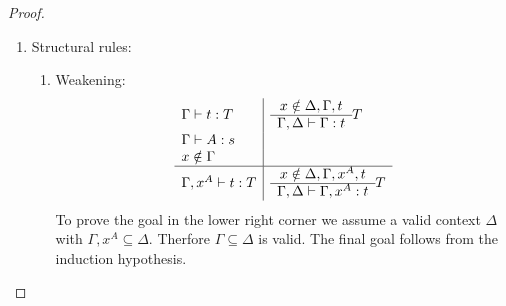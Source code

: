\begin{lemma}
\begin{proof}
{\begin{enumerate}
\begin{enumerate}
                \item Abstraction:
                $$
                \begin{array}{l|l}
                    \Gamma \vdash \Pi x^A. B: s
                    &
                    \goal \Delta \Gamma {\Pi x^A.B} s
                    \\
                    \Gamma,x^A \vdash e: B
                    &
                    \goal {\Delta'} {\Gamma, x^A} e B
                    \\
                    \hline
                    \Gamma \vdash \lambda x^A. e: \Pi x^A. B
                    &
                    \goal \Delta \Gamma {\lambda x^A. e} {\Pi x^A. B}
                \end{array}
                $$
                Same reasoning as with product.

                \item Application:
                $$
                \begin{array}{l|l}
                    \Gamma \vdash f: \Pi x^A.B
                    &
                    \goal \Delta \Gamma f {\Pi x^A.B}
                    \\
                    \Gamma \vdash a: A
                    &
                    \goal \Delta \Gamma a A
                    \\
                    \hline
                    \Gamma \vdash f a : B[x:=a]
                    &
                    \goal \Delta \Gamma {f a} {B[x:=a]}
                \end{array}
                $$
                The goal in the lower right corner is an immediate consequence
                of the induction hypotheses.
            \end{enumerate}

            \item Structural rules:
            \begin{enumerate}
                \item Weakening:
                $$
                \begin{array}{l|l}
                    \Gamma \vdash t : T
                    &
                    \begin{array}{c}  x \notin \Delta, \Gamma, t  \\ \hline  \Gamma,\Delta \vdash \Gamma : t \end{array} T
                    \\
                    \Gamma \vdash A : s
                    \\
                    x \notin \Gamma
                    \\
                    \hline
                    \Gamma,x^A \vdash t: T
                    &
                    \begin{array}{c}  x \notin \Delta, \Gamma,x^A, t  \\ \hline  \Gamma,\Delta \vdash \Gamma,x^A : t \end{array} T
                \end{array}
                $$
                To prove the goal in the lower right corner we assume a valid
                    context $\Delta$ with $\Gamma,x^A \subseteq \Delta$.
                    Therfore $\Gamma \subseteq \Delta$ is valid. The final goal
                    follows from the induction hypothesis.


\end{enumerate}
\end{enumerate}}
\end{proof}
\end{lemma}

